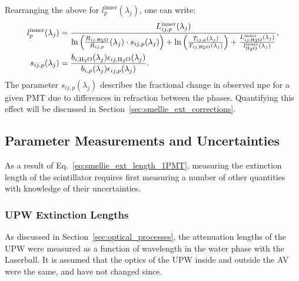Rearranging the above for $l_{p}^{\mathrm{inner}}(\lambda_{j})$, one can write:
\begin{align}\label{eq:smellie_ext_length_1PMT}
    l_{p}^{\mathrm{inner}}(\lambda_{j}) &= 
    \frac{
        L_{ij,p}^{\mathrm{inner}}(\lambda_{j})
        }{
        \ln\left(
            \frac{R_{ij,\ce{H_{2}O}}}{R_{ij,p}}(\lambda_{j})\cdot s_{ij,p}(\lambda_{j})
        \right)
        + \ln\left(
            \frac{T_{ij,p}(\lambda_{j})}{T_{ij,\ce{H_{2}O}}(\lambda_{j})}
        \right)
        + \frac{L_{ij,\ce{H_{2}O}}^{\mathrm{inner}}(\lambda_{j})}{l_{\ce{H_{2}O}}^{\mathrm{inner}}(\lambda_{j})}
    },\nonumber\\
    s_{ij,p}(\lambda_{j}) &=
    \frac{
        b_{i,\ce{H_{2}O}}(\lambda_{j})\epsilon_{ij,\ce{H_{2}O}}(\lambda_{j})
        }{
        b_{i,p}(\lambda_{j})\epsilon_{ij,p}(\lambda_{j})
    }.
\end{align}
The parameter $s_{ij,p}(\lambda_{j})$ describes the fractional change in observed npe for a given PMT due to differences in refraction between the phases. Quantifying this effect will be discussed in Section~\ref{sec:smellie_ext_corrections}.

\subsection{Parameter Measurements and Uncertainties}
As a result of Eq.~\ref{eq:smellie_ext_length_1PMT}, measuring the extinction length of the scintillator requires first measuring a number of other quantities with knowledge of their uncertainties.

\subsubsection{UPW Extinction Lengths}
As discussed in Section~\ref{sec:optical_processes}, the attenuation lengths of the UPW were measured as a function of wavelength in the water phase with the Laserball. It is assumed that the optics of the UPW inside and outside the AV were the same, and have not changed since.

